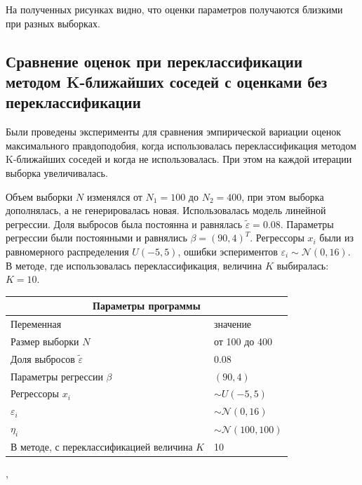На полученных рисунках видно, что оценки параметров получаются близкими при разных выборках.

\subsection{Сравнение оценок при переклассификации методом K-ближайших соседей с оценками без переклассификации}
Были проведены эксперименты для сравнения эмпирической вариации оценок максимального правдоподобия, когда использовалась переклассификация методом K-ближайших соседей и когда не использовалась. При этом на каждой итерации выборка увеличивалась. 

Объем выборки $N$ изменялся от $N_1=100$ до $N_2=400$, при этом выборка дополнялась, а не генерировалась новая. Использовалась модель линейной регрессии. Доля выбросов была постоянна и равнялась $\widetilde{\varepsilon}=0.08$. Параметры регрессии были постоянными и равнялись $\beta=(90,4)^T$. 
Регрессоры $x_i$ были из равномерного распределения $U(-5,5)$, ошибки эспериментов $\varepsilon_i\sim \mathcal{N}(0,16)$. В методе, где использовалась переклассификация, величина $K$ выбиралась: $K=10$.
\vspace{3cm}
\begin{center}
    \label{tab1}
    \begin{tabular}{|p{5cm}|p{5cm}|}
        \hline
        \multicolumn{2}{|c|}{Параметры программы} \\
        \hline
        Переменная&значение\\
        \hline
        Размер выборки $N$& от 100 до 400\\
        \hline
        Доля выбросов $\widetilde{\varepsilon}$& 0.08\\
        \hline
        Параметры регрессии $\beta$& $(90,4)$\\
        \hline
        Регрессоры $x_i$ & $\sim U(-5,5)$\\
        \hline
        $\varepsilon_i$&$\sim \mathcal{N}(0,16)$\\
        \hline
        $\eta_i$&$\sim \mathcal{N}(100,100)$\\
        \hline
        В методе, с переклассификацией величина $K$& 10\\
        \hline
    \end{tabular},
\end{center}

